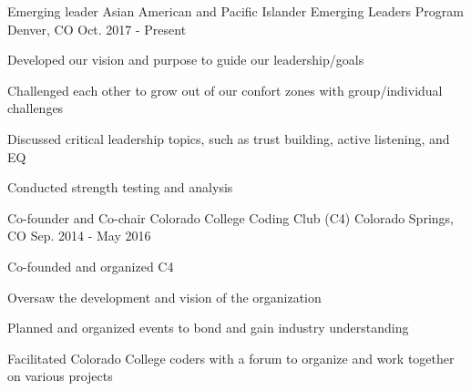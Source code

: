 


\begin{cventries}


\vspace{-.25em}
\cventry
{Emerging leader} %
{Asian American and Pacific Islander Emerging Leaders Program} %
{Denver, CO} %
{Oct. 2017 - Present} %
{ %
\begin{cvitems}
\item {Developed our vision and purpose to guide our leadership/goals}
\item {Challenged each other to grow out of our confort zones with group/individual challenges}
\item {Discussed critical leadership topics, such as trust building, active listening, and EQ}
\item {Conducted strength testing and analysis}
\end{cvitems}
}


\vspace{-1.25em}
\cventry
{Co-founder and Co-chair} %
{Colorado College Coding Club (C4)} %
{Colorado Springs, CO} %
{Sep. 2014 - May 2016} %
{ %
\begin{cvitems}
\item {Co-founded and organized C4}
\item {Oversaw the development and vision of the organization}
\item {Planned and organized events to bond and gain industry understanding}
\item {Facilitated Colorado College coders with a forum to organize and work together on various projects}
\end{cvitems}
}


\end{cventries}
